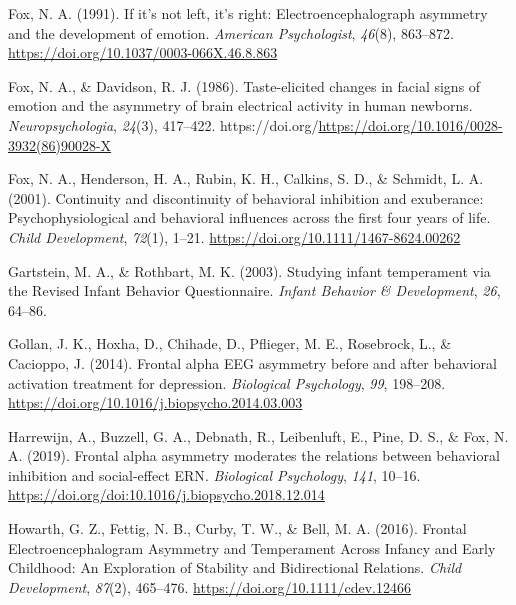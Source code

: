 \documentclass[
  man,
  floatsintext,
  longtable,
  nolmodern,
  notxfonts,
  notimes,
  colorlinks=true,linkcolor=blue,citecolor=blue,urlcolor=blue]{apa7}
\newlength{\cslhangindent}
\newenvironment{CSLReferences}[2] %
 {\begin{list}{}{%
  \setlength{\itemindent}{0pt}
  \setlength{\leftmargin}{0pt}
  \setlength{\parsep}{0pt}
  \ifodd #1
   \setlength{\leftmargin}{\cslhangindent}
   \setlength{\itemindent}{-1\cslhangindent}
  \fi
  \setlength{\itemsep}{#2\baselineskip}}}
 {\end{list}}
\begin{document}
\begin{CSLReferences}{1}{0}
Fox, N. A. (1991). If it's not left, it's right: {Electroencephalograph}
asymmetry and the development of emotion. \emph{American Psychologist},
\emph{46}(8), 863--872. \url{https://doi.org/10.1037/0003-066X.46.8.863}

Fox, N. A., \& Davidson, R. J. (1986). Taste-elicited changes in facial
signs of emotion and the asymmetry of brain electrical activity in human
newborns. \emph{Neuropsychologia}, \emph{24}(3), 417--422.
https://doi.org/\url{https://doi.org/10.1016/0028-3932(86)90028-X}

Fox, N. A., Henderson, H. A., Rubin, K. H., Calkins, S. D., \& Schmidt,
L. A. (2001). Continuity and discontinuity of behavioral inhibition and
exuberance: Psychophysiological and behavioral influences across the
first four years of life. \emph{Child Development}, \emph{72}(1), 1--21.
\url{https://doi.org/10.1111/1467-8624.00262}

Gartstein, M. A., \& Rothbart, M. K. (2003). Studying infant temperament
via the {Revised Infant Behavior Questionnaire}. \emph{Infant Behavior
\& Development}, \emph{26}, 64--86.

Gollan, J. K., Hoxha, D., Chihade, D., Pflieger, M. E., Rosebrock, L.,
\& Cacioppo, J. (2014). Frontal alpha {EEG} asymmetry before and after
behavioral activation treatment for depression. \emph{Biological
Psychology}, \emph{99}, 198--208.
\url{https://doi.org/10.1016/j.biopsycho.2014.03.003}

Harrewijn, A., Buzzell, G. A., Debnath, R., Leibenluft, E., Pine, D. S.,
\& Fox, N. A. (2019). Frontal alpha asymmetry moderates the relations
between behavioral inhibition and social-effect {ERN}. \emph{Biological
Psychology}, \emph{141}, 10--16.
\url{https://doi.org/doi:10.1016/j.biopsycho.2018.12.014}

Howarth, G. Z., Fettig, N. B., Curby, T. W., \& Bell, M. A. (2016).
Frontal {Electroencephalogram Asymmetry} and {Temperament Across
Infancy} and {Early Childhood}: {An Exploration} of {Stability} and
{Bidirectional Relations}. \emph{Child Development}, \emph{87}(2),
465--476. \url{https://doi.org/10.1111/cdev.12466}


\end{CSLReferences}
\end{document}
